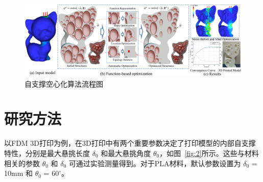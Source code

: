 \begin{figure}[!t]
  \centering
  \includegraphics[width=0.95 \textwidth]{./figures/self-support/fig2.png}
  \caption{自支撑空心化算法流程图}
  \label{fig:1}
\end{figure}

\section{研究方法}
以FDM 3D打印为例，在3D打印中有两个重要参数决定了打印模型的内部自支撑特性，分别是最大悬挑长度 $\delta_{0}$ 和最大悬挑角度 $\theta_{0}$，如图~\ref{fig:2}所示。这些与材料相关的参数 $\theta_{0}$ 和 $\delta_{0}$ 可通过实验测量得到。对于PLA材料，默认参数设置为 $\delta_{0}$ = 10mm 和 $\theta_0$ = $60^{\circ}$。

